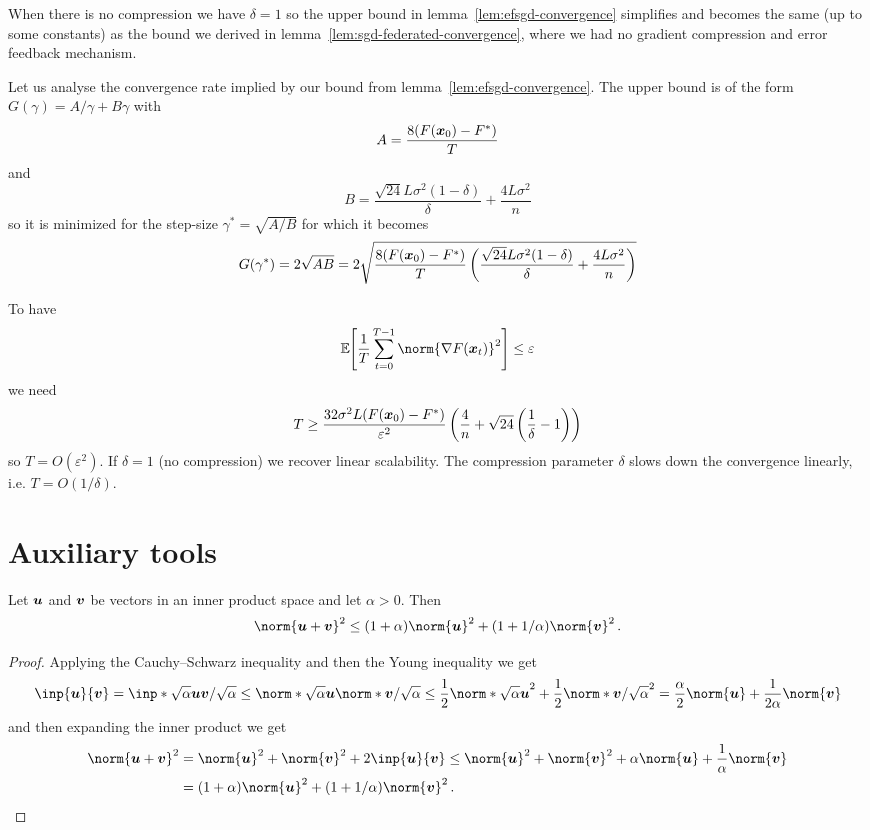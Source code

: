 \documentclass{article}
\begin{document}
\begin{remark}
  When there is no compression we have $\delta = 1$ so the upper bound in lemma~\ref{lem:efsgd-convergence} simplifies and becomes the same (up to some constants) as the bound we derived in lemma~\ref{lem:sgd-federated-convergence}, where we had no gradient compression and error feedback mechanism.
\end{remark}


Let us analyse the convergence rate implied by our bound from lemma~\ref{lem:efsgd-convergence}. The upper bound is of the form $G(\gamma) = A/\gamma + B \gamma$ with
\[
  A = \frac{8(F(\bm{x}_0) - F^\ast)}{T}
\]
and
\[
  B = \frac{\sqrt{24} L \sigma^2 (1-\delta)}{\delta} + \frac{4 L \sigma^2}{n}
\]
so it is minimized for the step-size $\gamma^\ast = \sqrt{A/B}$ for which it becomes
\[
  G(\gamma^\ast)
  =
  2\sqrt{AB}
  =
  2 \sqrt{\frac{8(F(\bm{x}_0) - F^\ast)}{T} \left(\frac{\sqrt{24} L \sigma^2 (1-\delta)}{\delta} + \frac{4 L \sigma^2}{n}\right)}
\]

\begin{lemma}\label{lem:efsgd-convergence-rate}
  To have
  \[
    \expec{\frac{1}{T} \sum_{t=0}^{T-1} \norm{\nabla F(\xx_t)}^2} \leq \varepsilon
  \]
  we need
  \[
    T \geq \frac{32 \sigma^2 L (F(\bm{x}_0) - F^\ast)}{\varepsilon^2} \left(\frac{4}{n} + \sqrt{24} \left(\frac{1}{\delta} - 1\right)\right)
  \]
  so $T = O(\varepsilon^2)$. If $\delta = 1$ (no compression) we recover linear scalability. The compression parameter $\delta$ slows down the convergence linearly, i.e. $T = O(1/\delta)$.
\end{lemma}


\section{Auxiliary tools}


\begin{proposition}\label{prop:ineq-young-norm}
  Let $\bm{u}$ and $\bm{v}$ be vectors in an inner product space and let $\alpha > 0$. Then
  \[
    \norm{\uu + \vv}^2 \leq (1 + \alpha) \norm{\uu}^2 + (1 + 1/\alpha) \norm{\vv}^2 \, .
  \]
\end{proposition}

\begin{proof}
  Applying the Cauchy--Schwarz inequality and then the Young inequality we get
  \[
    \inp{\uu}{\vv}
    =
    \inp*{\sqrt \alpha \uu }{\vv / \sqrt \alpha}
    \leq
    \norm*{\sqrt \alpha \uu} \norm*{\vv / \sqrt \alpha}
    \leq
    \frac{1}{2} \norm*{\sqrt \alpha \uu}^2 + \frac{1}{2} \norm*{\vv / \sqrt \alpha}^2
    =
    \frac{\alpha}{2} \norm{\uu} + \frac{1}{2 \alpha} \norm{\vv}
  \]
  and then expanding the inner product we get
  \begin{align*}
    \norm{\uu+\vv}^2
     & =
    \norm{\uu}^2 + \norm{\vv}^2 + 2 \inp{\uu}{\vv}
    \leq
    \norm{\uu}^2 + \norm{\vv}^2 + \alpha \norm{\uu} + \frac{1}{\alpha} \norm{\vv}
    \\
     & =
    (1 + \alpha) \norm{\uu}^2 + (1 + 1/\alpha) \norm{\vv}^2
    \, .
  \end{align*}
\end{proof}
\end{document}
